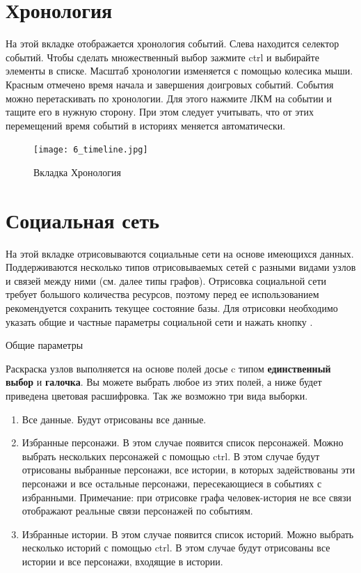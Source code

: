 \documentclass[a4paper,oneside,10pt,russian]{sphinxmanual}
\begin{document}
\section{Хронология}
\label{pages:id14}\label{pages:timeline-desc}
На этой вкладке отображается хронология событий. Слева находится селектор событий. Чтобы сделать множественный выбор зажмите ctrl и выбирайте элементы в списке. Масштаб хронологии изменяется с помощью колесика мыши. Красным отмечено время начала и завершения доигровых событий. События можно перетаскивать по хронологии. Для этого нажмите ЛКМ на событии и тащите его в нужную сторону. При этом следует учитывать, что от этих перемещений время событий в историях меняется автоматически.
\begin{figure}[H]
\centering
\capstart

\texttt{[image: 6\_timeline.jpg]}
\caption{Вкладка Хронология}\end{figure}
\newpage

\section{Социальная сеть}
\label{pages:social-network-desc}\label{pages:id15}
На этой вкладке отрисовываются социальные сети на основе имеющихся данных. Поддерживаются несколько типов отрисовываемых сетей с разными видами узлов и связей между ними (см. далее типы графов). Отрисовка социальной сети требует большого количества ресурсов, поэтому перед ее использованием рекомендуется сохранить текущее состояние базы. Для отрисовки необходимо указать общие и частные параметры социальной сети и нажать кнопку .

Общие параметры

Раскраска узлов выполняется на основе полей досье c типом \textbf{единственный выбор} и \textbf{галочка}. Вы можете выбрать любое из этих полей, а ниже будет приведена цветовая расшифровка.
Так же возможно три вида выборки.
\begin{enumerate}
\item {}
Все данные. Будут отрисованы все данные.

\item {}
Избранные персонажи. В этом случае появится список персонажей. Можно выбрать нескольких персонажей с помощью ctrl. В этом случае будут отрисованы выбранные персонажи, все истории, в которых задействованы эти персонажи и все остальные персонажи, пересекающиеся в событиях с избранными. Примечание: при отрисовке графа человек-история не все связи отображают реальные связи персонажей по событиям.

\item {}
Избранные истории. В этом случае появится список историй. Можно выбрать несколько историй с помощью ctrl. В этом случае будут отрисованы все истории и все персонажи, входящие в истории.

\end{enumerate}
\end{document}
